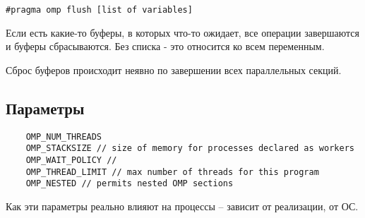 \documentclass[main.tex]{subfiles}
\begin{document}
\begin{verbatim}
#pragma omp flush [list of variables]
\end{verbatim}
Если есть какие-то буферы, в которых что-то ожидает, все операции завершаются и буферы сбрасываются.
Без списка - это относится ко всем переменным.

Сброс буферов происходит неявно по завершении всех параллельных секций. %

\subsection{Параметры}

\begin{verbatim}
	OMP_NUM_THREADS
	OMP_STACKSIZE // size of memory for processes declared as workers
	OMP_WAIT_POLICY // 
	OMP_THREAD_LIMIT // max number of threads for this program
	OMP_NESTED // permits nested OMP sections
\end{verbatim}

Как эти параметры реально влияют на процессы -- зависит от реализации, от ОС.
\end{document}
